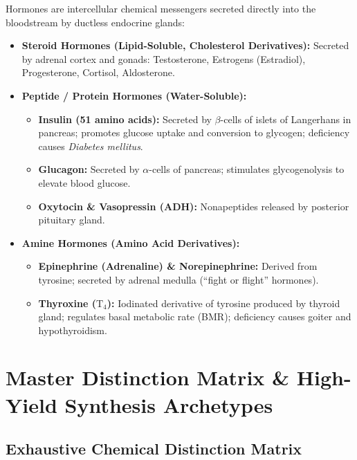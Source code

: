 \documentclass[10pt,a4paper]{article}
\begin{document}
\begin{conceptbox}
Hormones are intercellular chemical messengers secreted directly into the bloodstream by ductless endocrine glands:
\begin{itemize}
  \item \textbf{Steroid Hormones (Lipid-Soluble, Cholesterol Derivatives):}
  Secreted by adrenal cortex and gonads: Testosterone, Estrogens (Estradiol), Progesterone, Cortisol, Aldosterone.
  \item \textbf{Peptide / Protein Hormones (Water-Soluble):}
  \begin{itemize}
    \item \textbf{Insulin (51 amino acids):} Secreted by $\beta$-cells of islets of Langerhans in pancreas; promotes glucose uptake and conversion to glycogen; deficiency causes \textit{Diabetes mellitus}.
    \item \textbf{Glucagon:} Secreted by $\alpha$-cells of pancreas; stimulates glycogenolysis to elevate blood glucose.
    \item \textbf{Oxytocin \& Vasopressin (ADH):} Nonapeptides released by posterior pituitary gland.
  \end{itemize}
  \item \textbf{Amine Hormones (Amino Acid Derivatives):}
  \begin{itemize}
    \item \textbf{Epinephrine (Adrenaline) \& Norepinephrine:} Derived from tyrosine; secreted by adrenal medulla (``fight or flight'' hormones).
    \item \textbf{Thyroxine ($\mathrm{T_4}$):} Iodinated derivative of tyrosine produced by thyroid gland; regulates basal metabolic rate (BMR); deficiency causes goiter and hypothyroidism.
  \end{itemize}
\end{itemize}
\end{conceptbox}

\section{Master Distinction Matrix \& High-Yield Synthesis Archetypes}

\subsection{Exhaustive Chemical Distinction Matrix}
\end{document}

